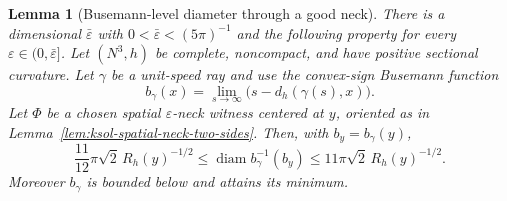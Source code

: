 \documentclass[10pt]{coll-l}
\newtheorem{lemma}[theorem]{Lemma}
\theoremstyle{definition}
\theoremstyle{remark}
\numberwithin{section}{chapter}
\numberwithin{equation}{chapter}
\begin{document}
\begin{lemma}[Busemann-level diameter through a good neck]
\label{lem:ksol-neck-Busemann-diameter}
There is a dimensional $\bar\varepsilon$ with
$0<\bar\varepsilon<(5\pi)^{-1}$ and the following property for every
$\varepsilon\in(0,\bar\varepsilon]$.
Let $(N^3,h)$ be complete, noncompact, and have positive sectional
curvature.  Let $\gamma$ be a unit-speed ray and use the convex-sign
Busemann function
\begin{equation}
             b_\gamma(x)=\lim_{s\to\infty}
                    \bigl(s-d_h(\gamma(s),x)\bigr).    \label{eq:ksol-convex-Busemann}
\end{equation}
Let $\Phi$ be a chosen spatial $\varepsilon$-neck witness centered at
$y$, oriented as in Lemma~\ref{lem:ksol-spatial-neck-two-sides}.  Then,
with $b_y=b_\gamma(y)$,
\begin{equation}
 \frac{11}{12}\pi\sqrt2\,R_h(y)^{-1/2}
 \leq\operatorname{diam}b_\gamma^{-1}(b_y)
 \leq11\pi\sqrt2\,R_h(y)^{-1/2}.                      \label{eq:ksol-neck-level-diameter-bound}
\end{equation}
Moreover $b_\gamma$ is bounded below and attains its minimum.
\end{lemma}
\end{document}
